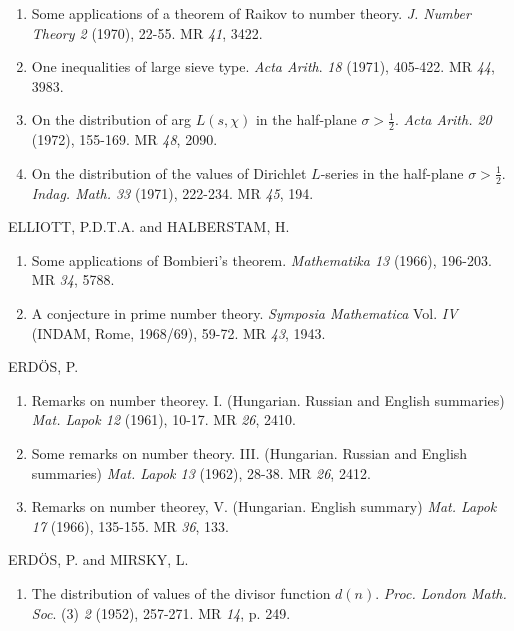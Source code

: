 \begin{thebibliography}{99}
\begin{enumerate}
\item Some applications of a theorem of Raikov to number
  theory. \textit{J. Number Theory 2} (1970), 22-55. MR {\em 41}, 3422. 

\item One inequalities of large sieve type. {\em Acta Arith}. {\em 18}
  (1971), 405-422. MR {\em 44}, 3983.

\item On the distribution of arg $L (s, \chi)$ in the half-plane
  $\sigma > \frac{1}{2}$. {\em Acta Arith. 20} (1972), 155-169. MR
  {\em 48}, 2090. 

\item On the distribution of the values of Dirichlet $L$-series in the
  half-plane $\sigma > \frac{1}{2}$. {\em Indag. Math. 33} (1971),
  222-234. MR {\em 45}, 194. 
\end{enumerate}

ELLIOTT, P.D.T.A. and HALBERSTAM, H.
\begin{enumerate}
\item Some applications of Bombieri's theorem. \textit{Mathematika
  13} (1966), 196-203. MR {\em 34}, 5788. 

\item A conjecture in prime number theory. \textit{Symposia
  Mathematica} Vol. {\em IV} (INDAM, Rome, 1968/69), 59-72. MR {\em
  43}, 1943.
\end{enumerate}

 ERD\"{O}S, P.
\begin{enumerate}
\item Remarks on number theorey. I. (Hungarian. Russian and English
  summaries) \textit{Mat. Lapok 12} (1961), 10-17. MR {\em 26}, 2410. 

\item Some remarks on number theory. III. (Hungarian. Russian and
  English summaries) \textit{Mat. Lapok 13} (1962), 28-38. MR {\em 26},
  2412. 

\item Remarks on number theorey, V. (Hungarian. English summary)
  \textit{Mat. Lapok 17} (1966), 135-155. MR {\em 36}, 133. 
\end{enumerate}

 ERD\"{O}S, P. and MIRSKY, L.
\begin{enumerate}
\item The distribution of values of the divisor function
  $d(n)$. \textit{Proc. London Math. Soc}. (3) {\em 2} (1952),
  257-271. MR {\em 14}, p. 249.
\end{enumerate}


\end{thebibliography}
